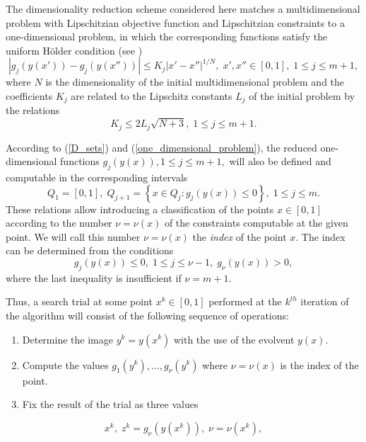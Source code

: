 \documentclass[preprint]{elsarticle}
\begin{document}
	The dimensionality reduction scheme considered here matches a multidimensional problem with Lipschitzian objective function and Lipschitzian constraints to a one-dimensional problem, in which the corresponding functions satisfy the uniform H\"{o}lder condition (see \cite{Strongin2000, Sergeyev2013})
$$
	\left|g_j(y(x'))-g_j(y(x''))\right| \leq K_j \left|x'-x'' \right|^{1/N}, \; x', x''\in [0,1], \; 1\leq j \leq m+1,
$$
where $N$ is the dimensionality of the initial multidimensional problem and the coefficients $K_j$ are related to the Lipschitz constants $L_j$ of the initial problem by the relations
\begin{equation}\label{K_leq_L}
	K_j \leq 2L_j \sqrt{N+3}, \; 1\leq j \leq m+1.
\end{equation}

	According to (\ref{D_sets}) and (\ref{one_dimensional_problem}), the reduced one-dimensional functions $g_j (y(x)), 1 \leq j \leq m+1,$ will also be defined and computable in the corresponding intervals 
\begin{equation}\label{Q_intervals}
	Q_1=[0,1], \; Q_{j+1}=\left\{x \in Q_j : g_j(y(x)) \leq 0 \right\}, \; 1 \leq j \leq m.
\end{equation}
These relations allow introducing a classification of the points $x \in [0,1]$ according to the number $\nu = \nu(x)$ of the constraints computable at the given point. We will call this number $\nu = \nu(x)$ the \textit{index} of the point $x$. The index can be determined from the conditions 
$$
	g_j(y(x)) \leq 0, \; 1 \leq j \leq \nu-1, \; g_{\nu}(y(x))>0,
$$
where the last inequality is insufficient if $\nu = m+1$. 

	Thus, a search trial at some point $x^k \in [0,1]$ performed at the $k^{th}$ iteration of the algorithm will consist of the following sequence of operations:
\begin{enumerate} 
  \item Determine the image $y^k=y(x^k )$ with the use of the evolvent $y(x)$. 
  \item Compute the values $g_1 (y^k ), \ldots ,g_{\nu} (y^k )$ where $\nu = \nu(x)$ is the index of the point.
	\item Fix the result of the trial as three values 
\end{enumerate}
	
\begin{equation}\label{trial_result}
	x^k, \; z^k = g_{\nu}\left( y(x^k) \right), \; \nu = \nu(x^k),
\end{equation}
\end{document}
